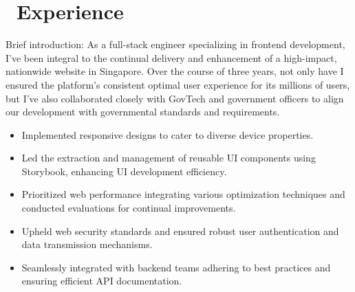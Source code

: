 \documentclass{resume}
\begin{document}



\section{\faUsers\ Experience}
\role{Software Developer}

Brief introduction: As a full-stack engineer specializing in frontend development, I've been integral to the continual delivery and enhancement of a high-impact, nationwide website in Singapore. Over the course of three years, not only have I ensured the platform's consistent optimal user experience for its millions of users, but I've also collaborated closely with GovTech and government officers to align our development with governmental standards and requirements.
\begin{itemize}
  \item Implemented responsive designs to cater to diverse device properties.
  \item Led the extraction and management of reusable UI components using Storybook, enhancing UI development efficiency.
  \item Prioritized web performance integrating various optimization techniques and conducted evaluations for continual improvements.
  \item Upheld web security standards and ensured robust user authentication and data transmission mechanisms.
  \item Seamlessly integrated with backend teams adhering to best practices and ensuring efficient API documentation.
\end{itemize}

\end{document}
